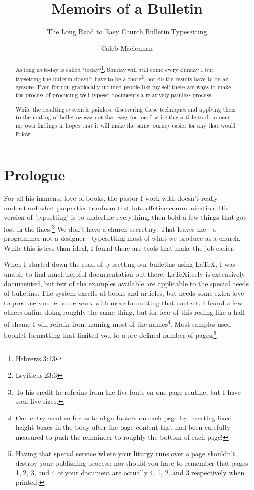 \documentclass[12pt]{scrartcl}
\title{Memoirs of a Bulletin}
\subtitle{The Long Road to Easy Church Bulletin Typesetting}
\author{Caleb Maclennan}
\makeatletter
\let\svmaketitle\maketitle
\def\maketitle{\protected@edef\saved@title{\@title}%
	\svmaketitle%
	\let\@title\saved@title}%
\makeatother
\begin{document}
\maketitle

\begin{abstract}
	As long as today is called "today"\footnote{Hebrews 3:13}, Sunday will still come every Sunday \dots but typsetting the bulletin doesn't have to be a chore\footnote{Leviticus 23:3}, nor do the results have to be an eyesore. Even for non-graphically-inclined people like mylself there are ways to make the process of producing well-typeset documents a relatively painless process.

While the resulting system is painless, discovering these techniques and applying them to the making of bulletins was not that easy for me. I write this article to document my own findings in hopes that it will make the same journey easier for any that would follow.
\end{abstract}

\section*{Prologue}

For all his immense love of books, the pastor I work with doesn't really understand what properties tranform text into effetive communication. His version of 'typsetting' is to underline everything, then bold a few things that got lost in the lines.\footnote{To his credit he refrains from the five-fonts-on-one-page routine, but I have seen five sizes.} We don't have a church secretary. That leaves me---a programmer not a designer---typesetting most of what we produce as a church. While this is less than ideal, I found there are tools that make the job easier.

When I started down the road of typsetting our bulletins using \LaTeX, I was unable to find much helpful documentation out there. \LaTeX itsely is extensively documented, but few of the examples available are applicable to the special needs of bulletins. The system excells at books and articles, but needs some extra love to produce smaller scale work with more formatting that content. I found a few others online doing roughly the same thing, but for fear of this reding like a hall of shame I will refrain from naming most of the names\footnote{One entry went so far as to align footers on each page by inserting fixed-height boxes in the body after the page content that had been carefully measured to push the remainder to roughly the bottom of each page!}. Most samples used booklet formatting that limited you to a pre-defined number of pages.\footnote{Having that special service where your liturgy runs over a page shouldn't destroy your publishing process; nor should you have to remember that pages 1, 2, 3, and 4 of your document are actually 4, 1, 2, and 3 respectively when printed.}
\end{document}
